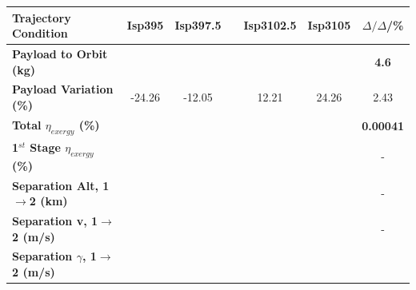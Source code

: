 \begin{table}[ht]
	\centering
	\begin{tabular}{l c c c c c c} 
		\hline \textbf{Trajectory Condition}
		&Isp395
		&Isp397.5
		&
		&Isp3102.5
		&Isp3105
		& $\Delta/\Delta$/\%
		\\
		\hline \textbf{Payload to Orbit (kg)}
		& \textbf{\PayloadToOrbitTThreeNinetyNoReturn}
		& \textbf{\PayloadToOrbitTThreeNinetyFiveNoReturn}
		& \textbf{\PayloadToOrbitTThreeStandardNoReturn}
		& \textbf{\PayloadToOrbitTThreeOneHundredFiveNoReturn}
		& \textbf{\PayloadToOrbitTThreeOneHundredTenNoReturn}
		&\textbf{4.6}
		\\
		\textbf{Payload Variation (\%)}
		& -24.26
		& -12.05
		& \PayloadVarTThreeStandardNoReturn
		& 12.21
		& 24.26
		&2.43
		\\
		\textbf{Total $\eta_{exergy}$ (\%)}
		& \textbf{\totalExergyEffTThreeNinetyNoReturn}
		& \textbf{\totalExergyEffTThreeNinetyFiveNoReturn}
		& \textbf{\totalExergyEffTThreeStandardNoReturn}
		& \textbf{\totalExergyEffTThreeOneHundredFiveNoReturn}
		& \textbf{\totalExergyEffTThreeOneHundredTenNoReturn}
		& \textbf{0.00041}
		\\
		\hline 
		\textbf{1$^{st}$ Stage $\eta_{exergy}$ (\%)}
		& \textbf{\firstExergyEffTThreeNinetyNoReturn}
		& \textbf{\firstExergyEffTThreeNinetyFiveNoReturn}
		& \textbf{\firstExergyEffTThreeStandardNoReturn}
		& \textbf{\firstExergyEffTThreeOneHundredFiveNoReturn}
		& \textbf{\firstExergyEffTThreeOneHundredTenNoReturn}
		& -
		\\
		\textbf{Separation Alt, 1$\rightarrow$2 (km)}
		& \firstsecondSeparationAltTThreeNinetyNoReturn
		& \firstsecondSeparationAltTThreeNinetyFiveNoReturn
		& \firstsecondSeparationAltTThreeStandardNoReturn
		& \firstsecondSeparationAltTThreeOneHundredFiveNoReturn
		& \firstsecondSeparationAltTThreeOneHundredTenNoReturn
		& -
		\\
		\textbf{Separation v, 1$\rightarrow$2 (m/s)}
		& \firstsecondSeparationvTThreeNinetyNoReturn
		& \firstsecondSeparationvTThreeNinetyFiveNoReturn
		& \firstsecondSeparationvTThreeStandardNoReturn
		& \firstsecondSeparationvTThreeOneHundredFiveNoReturn
		& \firstsecondSeparationvTThreeOneHundredTenNoReturn
		& -
		\\
		\textbf{Separation $\gamma$, 1$\rightarrow$2 (m/s)}
		& \firstsecondSeparationgammaTThreeNinetyNoReturn
		& \firstsecondSeparationgammaTThreeNinetyFiveNoReturn
		& \firstsecondSeparationgammaTThreeStandardNoReturn
		& \firstsecondSeparationgammaTThreeOneHundredFiveNoReturn

\end{tabular}
\end{table}

